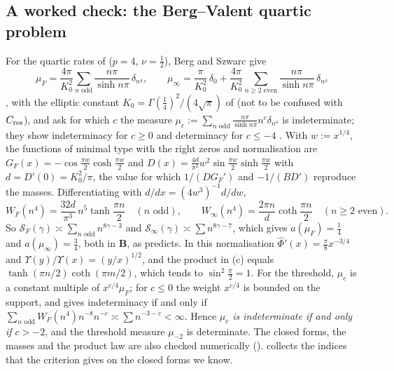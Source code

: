 \subsection{A worked check: the Berg--Valent quartic problem}

For the quartic rates of  ($p=4$, $\nu=\frac12$), Berg and Szwarc give
\[
  \mu_F=\frac{4\pi}{K_0^2}\sum_{n\text{ odd}}\frac{n\pi}{\sinh n\pi}\,\delta_{n^4},\qquad
  \mu_\infty=\frac{\pi}{K_0^2}\,\delta_0+\frac{4\pi}{K_0^2}\sum_{n\ge2\text{ even}}\frac{n\pi}{\sinh n\pi}\,\delta_{n^4}
\]
\cite[(29)--(30)]{BergSzwarc2026}, with the elliptic constant $K_0=\Gamma(\frac14)^2/(4\sqrt\pi)$ of
 (not to be confused with $C_{\mathrm{res}}$), and ask for which $c$ the measure
$\mu_c:=\sum_{n\text{ odd}}\frac{n\pi}{\sinh n\pi}n^c\delta_{n^4}$ is indeterminate; they show indeterminacy for
$c\ge0$ and determinacy for $c\le-4$ \cite[Ex.~4.1]{BergSzwarc2026}. With
$w:=x^{1/4}$, the functions of minimal type with the right zeros and normalisation are
$G_F(x)=-\cos\frac{\pi w}2\cosh\frac{\pi w}2$ and
$D(x)=\frac{4d}{\pi^2}w^2\sin\frac{\pi w}2\sinh\frac{\pi w}2$ with $d=D'(0)=K_0^2/\pi$, the value for which
$1/(DG_F')$ and $-1/(BD')$ reproduce the masses. Differentiating with $d/dx=(4w^3)^{-1}d/dw$,
\[
  W_F(n^4)=\frac{32d}{\pi^3}\,n^5\tanh\frac{\pi n}2\quad(n\text{ odd}),\qquad
  W_\infty(n^4)=\frac{2\pi n}{d}\coth\frac{\pi n}2\quad(n\ge2\text{ even}).
\]
So $\mathcal S_F(\gamma)\asymp\sum_{n\text{ odd}}n^{8\gamma-3}$ and $\mathcal S_\infty(\gamma)\asymp\sum n^{8\gamma-7}$, which gives
$a(\mu_F)=\frac14$ and $a(\mu_\infty)=\frac34$, both in $\mathbf B$, as  predicts. In this
normalisation $\hat\Phi'(x)=\frac\pi8x^{-3/4}$ and $\Upsilon(y)/\Upsilon(x)=(y/x)^{1/2}$, and the product in
(c) equals $\tanh(\pi n/2)\coth(\pi m/2)$, which tends to $\sin^2\frac\pi2=1$. For the
threshold, $\mu_c$ is a constant multiple of $x^{c/4}\mu_F$; for $c\le0$ the weight $x^{c/4}$ is bounded on
the support, and  gives indeterminacy if and only if
$\sum_{n\text{ odd}}W_F(n^4)n^{-8}n^{-c}\asymp\sum n^{-3-c}<\infty$. Hence \emph{$\mu_c$ is indeterminate if and
only if $c>-2$}, and the threshold measure $\mu_{-2}$ is determinate. The closed forms, the masses and
the product law are also checked numerically ().  collects the
indices that the criterion gives on the closed forms we know.

